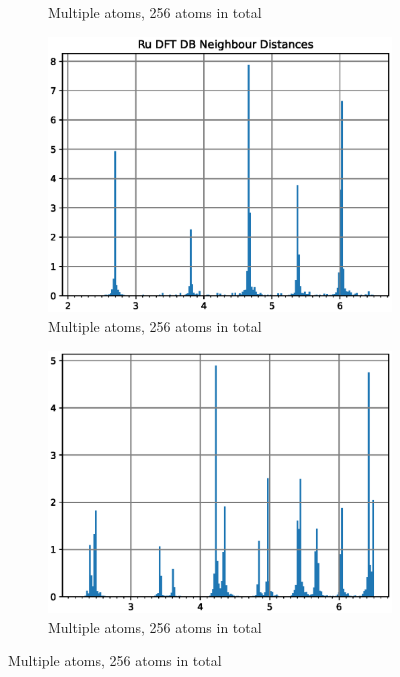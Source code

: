 \begin{figure}
\begin{subfigure}{.32\textwidth}
  \caption{Multiple atoms, 256 atoms in total}
  \label{fig:sub-first}
\end{subfigure}
\begin{subfigure}{.32\textwidth}
  \centering
  \includegraphics[width=.94\linewidth]{chapters/potentials_fe_pd_ru/neighbour_distances/db_ru_neighbours.eps}  
  \caption{Multiple atoms, 256 atoms in total}
  \label{fig:sub-first}
\end{subfigure}
\begin{subfigure}{.32\textwidth}
  \centering
  \includegraphics[width=.94\linewidth]{chapters/potentials_fe_pd_ru/neighbour_distances/db_fepd_neighbours.eps}  
  \caption{Multiple atoms, 256 atoms in total}
  \label{fig:sub-first}
\end{subfigure}

\end{figure}
